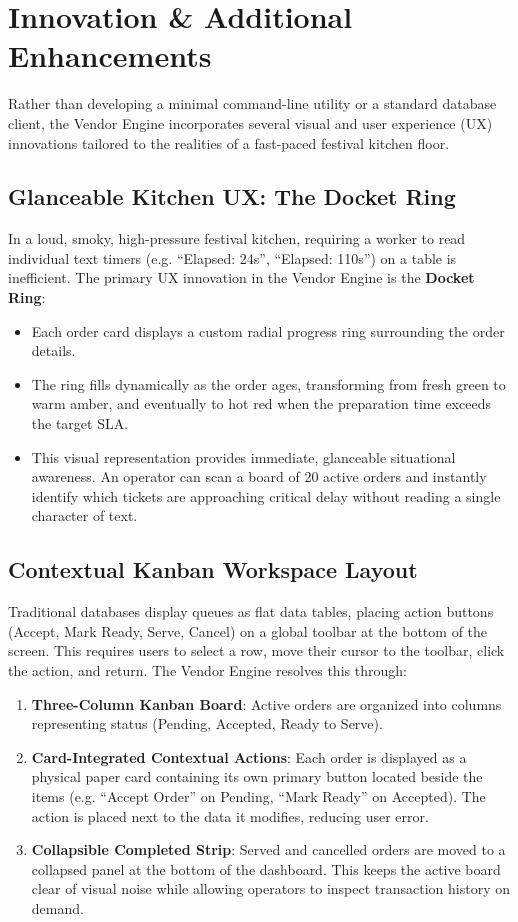 
\section{Innovation \& Additional Enhancements}
\label{sec:innovation}

Rather than developing a minimal command-line utility or a standard database client, the Vendor Engine incorporates several visual and user experience (UX) innovations tailored to the realities of a fast-paced festival kitchen floor.

\subsection{Glanceable Kitchen UX: The Docket Ring}
In a loud, smoky, high-pressure festival kitchen, requiring a worker to read individual text timers (e.g. ``Elapsed: 24s'', ``Elapsed: 110s'') on a table is inefficient. The primary UX innovation in the Vendor Engine is the \textbf{Docket Ring}:
\begin{itemize}
    \item Each order card displays a custom radial progress ring surrounding the order details.
    \item The ring fills dynamically as the order ages, transforming from fresh green to warm amber, and eventually to hot red when the preparation time exceeds the target SLA.
    \item This visual representation provides immediate, glanceable situational awareness. An operator can scan a board of 20 active orders and instantly identify which tickets are approaching critical delay without reading a single character of text.
\end{itemize}

\subsection{Contextual Kanban Workspace Layout}
Traditional databases display queues as flat data tables, placing action buttons (Accept, Mark Ready, Serve, Cancel) on a global toolbar at the bottom of the screen. This requires users to select a row, move their cursor to the toolbar, click the action, and return. The Vendor Engine resolves this through:
\begin{enumerate}
    \item \textbf{Three-Column Kanban Board}: Active orders are organized into columns representing status (Pending, Accepted, Ready to Serve).
    \item \textbf{Card-Integrated Contextual Actions}: Each order is displayed as a physical paper card containing its own primary button located beside the items (e.g. ``Accept Order'' on Pending, ``Mark Ready'' on Accepted). The action is placed next to the data it modifies, reducing user error.
    \item \textbf{Collapsible Completed Strip}: Served and cancelled orders are moved to a collapsed panel at the bottom of the dashboard. This keeps the active board clear of visual noise while allowing operators to inspect transaction history on demand.
\end{enumerate}

